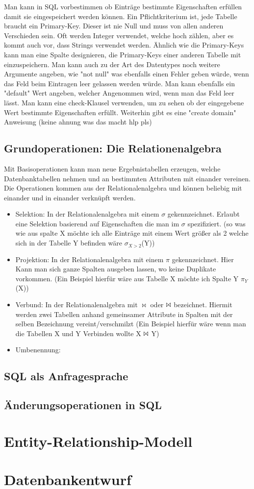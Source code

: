 \documentclass[12pt,a4paper]{article} %
\begin{document}
	Man kann in SQL vorbestimmen ob Einträge bestimmte Eigenschaften erfüllen damit sie eingespeichert werden können. Ein Pflichtkriterium ist, jede Tabelle braucht ein Primary-Key. Dieser ist nie Null und muss von allen anderen Verschieden sein. Oft werden Integer verwendet, welche hoch zählen, aber es kommt auch vor, dass Strings verwendet werden. Ähnlich wie die Primary-Keys kann man eine Spalte designieren, die Primary-Keys einer anderen Tabelle mit einzuspeichern. Man kann auch zu der Art des Datentypes noch weitere Argumente angeben, wie "not null" was ebenfalls einen Fehler geben würde, wenn das Feld beim Eintragen leer gelassen werden würde. Man kann ebenfalls ein "default" Wert angeben, welcher Angenommen wird, wenn man das Feld leer lässt. Man kann eine check-Klausel verwenden, um zu sehen ob der eingegebene Wert bestimmte Eigenschaften erfüllt. Weiterhin gibt es eine "create domain" Anweisung (keine ahnung was das macht hlp pls)	
	
	\subsection{Grundoperationen: Die Relationenalgebra}
	Mit Basisoperationen kann man neue Ergebnistabellen erzeugen, welche Datenbanktabellen nehmen und an bestimmten Attributen mit einander vereinen. Die Operationen kommen aus der Relationalenalgebra und können beliebig mit einander und in einander verknüpft werden. 
	
	\begin{itemize}
		\item Selektion: In der Relationalenalgebra mit einem $\sigma$ gekennzeichnet. Erlaubt eine Selektion basierend auf Eigenschaften die man im $\sigma$ spezifiziert. (so was wie aus spalte X möchte ich alle Einträge mit einem Wert größer als 2 welche sich in der Tabelle Y befinden wäre $\sigma_{X>2}$(Y))
		\item Projektion: In der Relationalenalgebra mit einem $\pi$ gekennzeichnet. Hier Kann man sich ganze Spalten ausgeben lassen, wo keine Duplikate vorkommen. (Ein Beispiel hierfür wäre aus Tabelle X möchte ich Spalte Y $\pi_{Y}$(X))
		\item Verbund: In der Relationalenalgebra mit $\bowtie$ oder $\Bowtie$ bezeichnet. Hiermit werden zwei Tabellen anhand gemeinsamer Attribute in Spalten mit der selben Bezeichnung vereint/verschmilzt (Ein Beispiel hierfür wäre wenn man die Tabellen X und Y Verbinden wollte X $\Bowtie$ Y)
		\item Umbenennung: 
	\end{itemize}
	
	\subsection{SQL als Anfragesprache}
	
	\subsection{Änderungsoperationen in SQL}
	
	\newpage
	\section{Entity-Relationship-Modell}
	
	\newpage
	\section{Datenbankentwurf}
	
\end{document}
